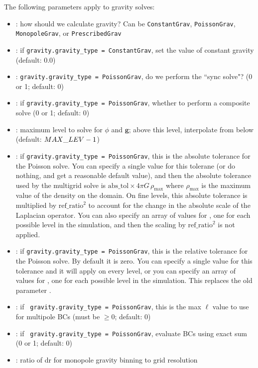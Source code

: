 The following parameters apply to gravity
solves:
\begin{itemize}
\item {} : how should we calculate gravity?
  Can be {\tt ConstantGrav}, {\tt PoissonGrav}, {\tt MonopoleGrav}, or
  {\tt PrescribedGrav}

\item {} : if {\tt gravity.gravity\_type =
  ConstantGrav}, set the value of constant gravity (default: 0.0)

\item {} : {\tt gravity.gravity\_type =
  PoissonGrav}, do we perform the ``sync solve"? (0 or 1; default: 0)

\item {} : if {\tt gravity.gravity\_type
  = PoissonGrav}, whether to perform a composite solve (0 or 1;
  default: 0)

\item {} : maximum level to solve
  for $\phi$ and $\mathbf{g}$; above this level, interpolate from
  below (default: ${\tt MAX\_LEV} - 1$)

\item {} : if {\tt gravity.gravity\_type =
  PoissonGrav}, this is the absolute tolerance for the Poisson
  solve. You can specify a single value for this tolerane (or do
  nothing, and get a reasonable default value), and then the absolute
  tolerance used by the multigrid solve is $\text{abs\_tol} \times
  4\pi G\, \rho_{\text{max}}$ where $\rho_{\text{max}}$ is the maximum
  value of the density on the domain.  On fine levels, this absolute
  tolerance is multiplied by $\text{ref\_ratio}^2$ to account for the
  change in the absolute scale of the Laplacian operator.  You can
  also specify an array of values for , one for each
  possible level in the simulation, and then the scaling by
  $\text{ref\_ratio}^2$ is not applied.

\item {} : if {\tt gravity.gravity\_type
  = PoissonGrav}, this is the relative tolerance for the Poisson
  solve. By default it is zero. You can specify a single value for
  this tolerance and it will apply on every level, or you can specify
  an array of values for , one for each possible level
  in the simulation. This replaces the old parameter
  .

\item {} : if {\tt
  gravity.gravity\_type = PoissonGrav}, this is the max $\ell$ value
  to use for multipole BCs (must be $\geq 0$; default: 0)

\item {} : if {\tt
  gravity.gravity\_type = PoissonGrav}, evaluate BCs using exact sum
  (0 or 1; default: 0)

\item {} : ratio of dr for monopole gravity
  binning to grid resolution
\end{itemize}

